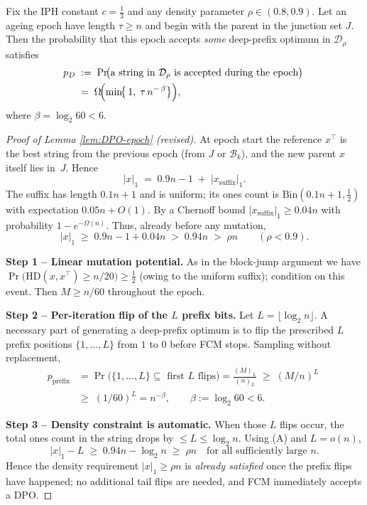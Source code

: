 \documentclass[lettersize,journal]{IEEEtran}
\begin{document}
\begin{lemma}
	\label{lem:DPO-epoch}
	Fix the IPH constant \(c=\tfrac13\) and any density parameter \(\rho\in(0.8,0.9)\).  
	Let an ageing epoch have length \(\tau\ge n\) and begin with the parent in the
	junction set \(J\).  
	Then the probability that this epoch accepts \emph{some}
	deep-prefix optimum in \(\mathcal{D}_\rho\) satisfies
	\begin{align*}
	p_D
	\;&:=\;
	\Pr\!\bigl(\text{a string in }\mathcal{D}_\rho\text{ is accepted during the epoch}\bigr)
	\;\\&=\;
	\Omega\!\Bigl(\min\!\bigl\{\,1,\;
	\tau\,n^{-\,\beta}\bigr\}\Bigr),
	\end{align*}
	where \(\beta=\log_{2}60<6\). 
\end{lemma}
\begin{proof}[Proof of Lemma \ref{lem:DPO-epoch} (revised)]
	At epoch start the reference $x^\top$ is the best string from the previous
	epoch (from $J$ or $\mathcal{B}_k$), and the new parent $x$ itself lies in~$J$.
	Hence
	\[
	|x|_1\;=\;0.9n-1 \;+\; |x_{\text{suffix}}|_1.
	\]
	The suffix has length $0.1n+1$ and is uniform; its ones count is
	$\mathrm{Bin}(0.1n+1,\tfrac12)$ with expectation $0.05n+O(1)$.
	By a Chernoff bound
	\(
	|x_{\text{suffix}}|_1\ge 0.04n
	\)
	with probability $1-e^{-\Omega(n)}$.
	Thus, already before any mutation,
	\[
	|x|_1
	\;\ge\;
	0.9n-1 + 0.04n
	\;>\;
	0.94n
	\;>\;
	\rho n
	\qquad(\rho<0.9).
	\tag{A}
	\]
	
	\textbf{Step 1 – Linear mutation potential.}
	As in the block-jump argument we have
	\(
	\Pr\!\bigl(\mathrm{HD}(x,x^\top)\ge n/20\bigr)\ge\tfrac12
	\)
	(owing to the uniform suffix); condition on this event.
	Then \(M\ge n/60\) throughout the epoch.
	
	\textbf{Step 2 – Per-iteration flip of the \(L\) prefix bits.}
	Let \(L=\lfloor\log_2 n\rfloor\).
	A necessary part of generating a deep-prefix optimum is to flip the prescribed
	\(L\) prefix positions $\{1,\dots,L\}$ from $1$ to $0$ before FCM stops.
	Sampling without replacement,
	\begin{align*}
	p_{\text{prefix}}
	&=\Pr\bigl(\{1,\dots,L\}\subseteq\text{ first }L\text{ flips}\bigr)
	=\frac{(M)_{L}}{(n)_{L}}
	\;\ge\;
	(M/n)^{L}
	\;\\&\ge\;
	(1/60)^{L}
	=n^{-\beta},\qquad
	\beta:=\log_{2}60<6.
	\end{align*}
	
	\textbf{Step 3 – Density constraint is automatic.}
	When those $L$ flips occur, the total ones count in the string drops by
	\(\le L\le\log_2 n\).
	Using (A) and \(L=o(n)\),
	\[
	|x|_1-L\;\ge\;0.94n-\log_2 n
	\;\ge\;\rho n
	\quad\text{for all sufficiently large }n.
	\]
	Hence the density requirement \(|x|_1\ge\rho n\) is \emph{already satisfied}
	once the prefix flips have happened; no additional tail flips are needed, and
	FCM immediately accepts a DPO.
	

\end{proof}
\end{document}
